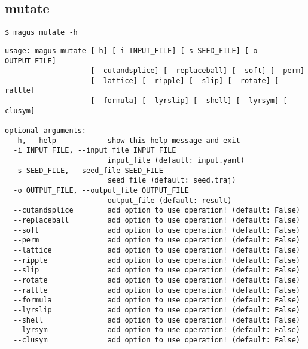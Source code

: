 \documentclass[12pt,oneside]{book}
\begin{document}
\subsection{mutate}
\begin{tcolorbox}
    \begin{verbatim}
$ magus mutate -h
    \end{verbatim}
    \tcblower
    \begin{verbatim}
usage: magus mutate [-h] [-i INPUT_FILE] [-s SEED_FILE] [-o OUTPUT_FILE]
                    [--cutandsplice] [--replaceball] [--soft] [--perm]
                    [--lattice] [--ripple] [--slip] [--rotate] [--rattle]
                    [--formula] [--lyrslip] [--shell] [--lyrsym] [--clusym]

optional arguments:
  -h, --help            show this help message and exit
  -i INPUT_FILE, --input_file INPUT_FILE
                        input_file (default: input.yaml)
  -s SEED_FILE, --seed_file SEED_FILE
                        seed_file (default: seed.traj)
  -o OUTPUT_FILE, --output_file OUTPUT_FILE
                        output_file (default: result)
  --cutandsplice        add option to use operation! (default: False)
  --replaceball         add option to use operation! (default: False)
  --soft                add option to use operation! (default: False)
  --perm                add option to use operation! (default: False)
  --lattice             add option to use operation! (default: False)
  --ripple              add option to use operation! (default: False)
  --slip                add option to use operation! (default: False)
  --rotate              add option to use operation! (default: False)
  --rattle              add option to use operation! (default: False)
  --formula             add option to use operation! (default: False)
  --lyrslip             add option to use operation! (default: False)
  --shell               add option to use operation! (default: False)
  --lyrsym              add option to use operation! (default: False)
  --clusym              add option to use operation! (default: False)
    \end{verbatim}
\end{tcolorbox}
\end{document}
